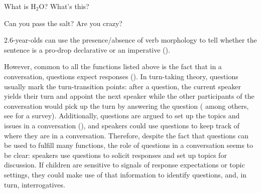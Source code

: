 \vspace{-2ex} 
\noindent
\begin{minipage}[t]{0.4\linewidth}	
\bxl\label{bg-prag:test}
What is H$_{2}$O?		\hfill {}
\ex \label{bg-prag:ped}
What's this?	\hfill {}
\exl
\eex
\end{minipage}
\hspace{1cm}
\begin{minipage}[t]{0.45\linewidth}
\bex{}
\bxl\label{bg-prag:req}
Can you pass the salt?			\hfill {}
\ex \label{bg-prag:rhe}
Are you crazy?	\hfill {}
\exl
\eex
\end{minipage}


2.6-year-olds can use the presence/absence of verb morphology to tell whether the sentence is a pro-drop declarative or an imperative (\cite{orfitellihyams2012subj}). 

\noindent However, common to all the functions listed above is the fact that in a conversation, questions expect responses (\citealt{duncan1972turn}). In turn-taking theory, questions usually mark the turn-transition points: after a question, the current speaker yields their turn and appoint the next speaker while the other participants of the conversation would pick up the turn by answering the question (\citealt{kendon1967gaze, argyle1972gaze, levinson1983, tice2011turn} among others, see \citealt{enfield2010} for a survey).  Additionally, questions are argued to set up the topics and issues in a conversation (\citealt{roberts2012,farkasbruce2010}), and speakers could use questions to keep track of where they are in a conversation. Therefore, despite the fact that questions can be used to fulfill many functions, the role of questions in a conversation seems to be clear: speakers use questions to solicit responses and set up topics for discussion. If children are sensitive to signals of response expectations or topic settings, they could make use of that information to identify questions, and, in turn, interrogatives. 

